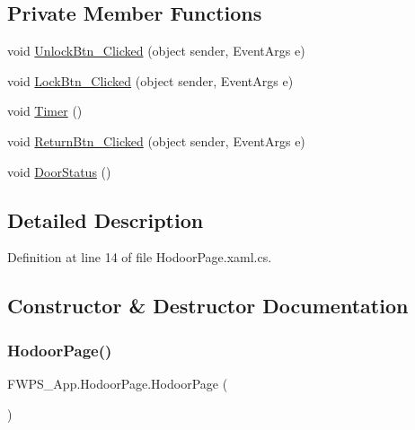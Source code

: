 \subsection*{Private Member Functions}
\begin{DoxyCompactItemize}
\item 
void \mbox{\hyperlink{class_f_w_p_s___app_1_1_hodoor_page_a50290552eb94ed47ab0ff34a55a2ed14}{Unlock\+Btn\+\_\+\+Clicked}} (object sender, Event\+Args e)
\item 
void \mbox{\hyperlink{class_f_w_p_s___app_1_1_hodoor_page_a19f9220a20d82e45ffbd3001e7252c94}{Lock\+Btn\+\_\+\+Clicked}} (object sender, Event\+Args e)
\item 
void \mbox{\hyperlink{class_f_w_p_s___app_1_1_hodoor_page_adba463a358bd80d1a75802a1a5110778}{Timer}} ()
\item 
void \mbox{\hyperlink{class_f_w_p_s___app_1_1_hodoor_page_a6b5b1dd42e9c74dfd126b3e706174b45}{Return\+Btn\+\_\+\+Clicked}} (object sender, Event\+Args e)
\item 
void \mbox{\hyperlink{class_f_w_p_s___app_1_1_hodoor_page_abe321601720397c96eef7cdd451b9456}{Door\+Status}} ()
\end{DoxyCompactItemize}


\subsection{Detailed Description}


Definition at line 14 of file Hodoor\+Page.\+xaml.\+cs.



\subsection{Constructor \& Destructor Documentation}
\mbox{\label{class_f_w_p_s___app_1_1_hodoor_page_a51754d10d86aec441ab5791ccda07016}} 
\subsubsection{\texorpdfstring{Hodoor\+Page()}{HodoorPage()}}
{\footnotesize\ttfamily F\+W\+P\+S\+\_\+\+App.\+Hodoor\+Page.\+Hodoor\+Page (\begin{DoxyParamCaption}{ }\end{DoxyParamCaption})}



